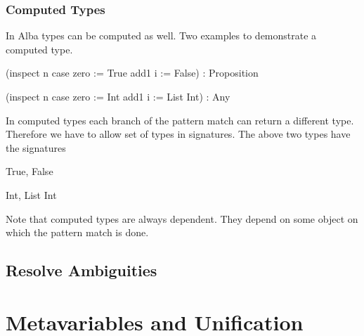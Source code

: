 \subsubsection{Computed Types}

In Alba types can be computed as well. Two examples to demonstrate a computed
type.
%
\begin{alba}
    (inspect n case
        zero := True
        add1 i := False)
    : Proposition

    (inspect n case
        zero := Int
        add1 i := List Int)
    : Any
\end{alba}
%
In computed types each branch of the pattern match can return a different type.
Therefore we have to allow set of types in signatures. The above two types have
the signatures
%
\begin{alba}
    {True, False}

    {Int, List Int}
\end{alba}

Note that computed types are always dependent. They depend on some object on
which the pattern match is done.






\subsection{Resolve Ambiguities}







\section{Metavariables and Unification}
